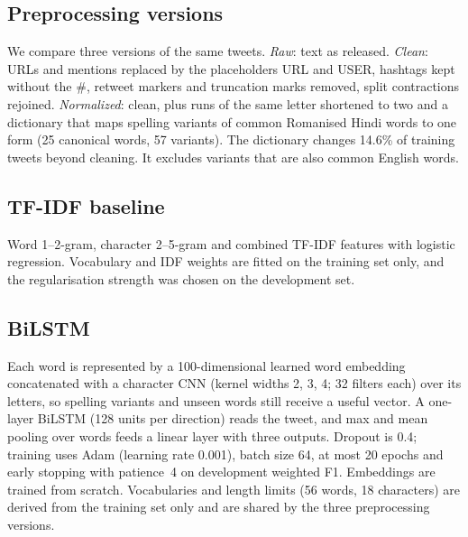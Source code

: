 \subsection{Preprocessing versions}
We compare three versions of the same tweets. \emph{Raw}: text as released. \emph{Clean}: URLs and mentions replaced by
the placeholders URL and USER, hashtags kept without the \#, retweet markers and truncation marks removed, split
contractions rejoined. \emph{Normalized}: clean, plus runs of the same letter shortened to two and a dictionary that maps
spelling variants of common Romanised Hindi words to one form (25 canonical words, 57 variants). The dictionary changes
14.6\% of training tweets beyond cleaning. It excludes variants that are also common English words.

\subsection{TF-IDF baseline}
Word 1--2-gram, character 2--5-gram and combined TF-IDF features with logistic regression. Vocabulary and IDF weights are
fitted on the training set only, and the regularisation strength was chosen on the development set.

\subsection{BiLSTM}
Each word is represented by a 100-dimensional learned word embedding concatenated with a character CNN (kernel widths
2, 3, 4; 32 filters each) over its letters, so spelling variants and unseen words still receive a useful vector. A one-layer
BiLSTM (128 units per direction) reads the tweet, and max and mean pooling over words feeds a linear layer with three outputs.
Dropout is 0.4; training uses Adam (learning rate 0.001), batch size 64, at most 20 epochs and early stopping with patience~4
on development weighted F1. Embeddings are trained from scratch. Vocabularies and length limits (56 words, 18 characters) are
derived from the training set only and are shared by the three preprocessing versions.

